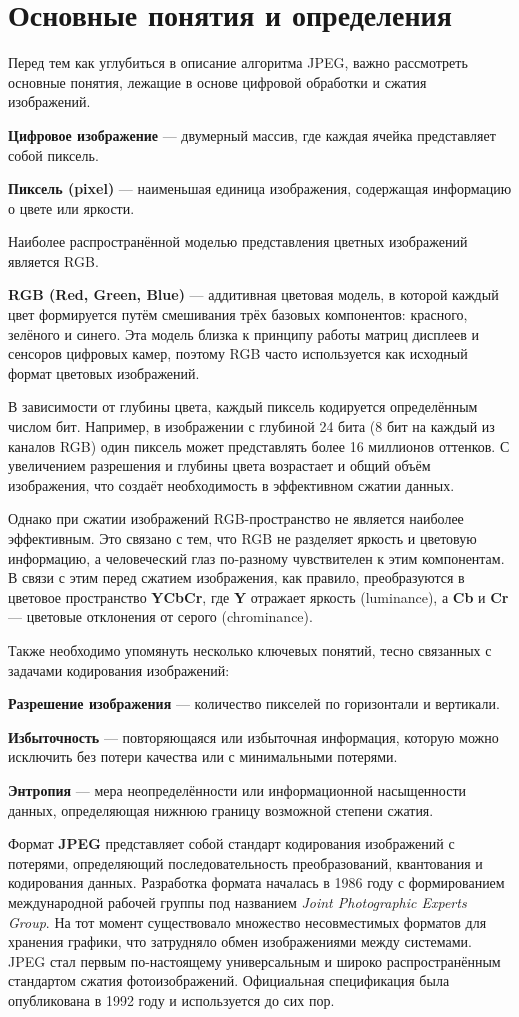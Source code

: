 \newpage
\section{Основные понятия и определения}

Перед тем как углубиться в описание алгоритма JPEG, важно рассмотреть основные понятия, лежащие в основе цифровой обработки и сжатия изображений.


\textbf{Цифровое изображение} — двумерный массив, где каждая ячейка представляет собой пиксель.
\IMageTable


\textbf{Пиксель (pixel)} — наименьшая единица изображения, содержащая информацию о цвете или яркости.
\PixelTable


Наиболее распространённой моделью представления цветных изображений является RGB.

\textbf{RGB (Red, Green, Blue)} — аддитивная цветовая модель, в которой каждый цвет формируется путём смешивания трёх базовых компонентов: красного, зелёного и синего. 
Эта модель близка к принципу работы матриц дисплеев и сенсоров цифровых камер, поэтому RGB часто используется как исходный формат цветовых изображений.

В зависимости от глубины цвета, каждый пиксель кодируется определённым числом бит. 
Например, в изображении с глубиной 24 бита (8 бит на каждый из каналов RGB) один пиксель может представлять более 16 миллионов оттенков. 
С увеличением разрешения и глубины цвета возрастает и общий объём изображения, что создаёт необходимость в эффективном сжатии данных.

Однако при сжатии изображений RGB-пространство не является наиболее эффективным. Это связано с тем, что RGB не разделяет яркость и цветовую информацию, а человеческий глаз по-разному чувствителен к этим компонентам. 
В связи с этим перед сжатием изображения, как правило, преобразуются в цветовое пространство \textbf{YCbCr}, где \textbf{Y} отражает яркость (luminance), а \textbf{Cb} и \textbf{Cr} — цветовые отклонения от серого (chrominance). 

Также необходимо упомянуть несколько ключевых понятий, тесно связанных с задачами кодирования изображений:

\textbf{Разрешение изображения} — количество пикселей по горизонтали и вертикали.

\textbf{Избыточность} — повторяющаяся или избыточная информация, которую можно исключить без потери качества или с минимальными потерями.

\textbf{Энтропия} — мера неопределённости или информационной насыщенности данных, определяющая нижнюю границу возможной степени сжатия.

Формат \textbf{JPEG} представляет собой стандарт кодирования изображений с потерями, определяющий последовательность преобразований, квантования и кодирования данных. 
Разработка формата началась в 1986 году с формированием международной рабочей группы под названием \emph{Joint Photographic Experts Group}. 
На тот момент существовало множество несовместимых форматов для хранения графики, что затрудняло обмен изображениями между системами. 
JPEG стал первым по-настоящему универсальным и широко распространённым стандартом сжатия фотоизображений. 
Официальная спецификация была опубликована в 1992 году и используется до сих пор.
